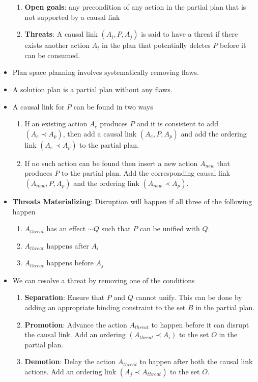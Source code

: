 \documentclass[a4paper]{article}
\begin{document}
\begin{itemize}
    \begin{enumerate}
        \item \textbf{Open goals}: any precondition of any action in the partial plan that is not supported by a causal link
        \item \textbf{Threats}: A causal link $(A_i,P,A_j)$ is said to have a threat if there exists another action $A_t$ in the plan that potentially deletes $P$ before it can be consumed.
    \end{enumerate}
    \item Plan space planning involves systematically removing flaws.
    \item A solution plan is a partial plan without any flaws.
    \item A causal link for $P$ can be found in two ways
    \begin{enumerate}
        \item If an existing action $A_e$ produces $P$ and it is consistent to add $(A_e\prec A_p)$, then add a causal link $(A_e,P,A_p)$ and add the ordering link $(A_e\prec A_p)$ to the partial plan.
        \item If no such action can be found then insert a new action $A_{new}$ that produces $P$ to the partial plan. Add the corresponding causal link $(A_{new},P,A_p)$ and the ordering link $(A_{new}\prec A_p)$.
    \end{enumerate}
    \item \textbf{Threats Materializing}: Disruption will happen if all three of the following happen
    \begin{enumerate}
        \item $A_{threat}$ has an effect $\sim Q$ such that $P$ can be unified with $Q$.
        \item $A_{threat}$ happens after $A_i$
        \item $A_{threat}$ happens before $A_j$
    \end{enumerate}
    \item We can resolve a threat by removing one of the conditions
    \begin{enumerate}
        \item \textbf{Separation}: Ensure that $P$ and $Q$ cannot unify. This can be done by adding an appropriate binding constraint to the set $B$ in the partial plan.
        \item \textbf{Promotion}: Advance the action $A_{threat}$ to happen before it can disrupt the causal link. Add an ordering $(A_{threat}\prec A_i)$ to the set $O$ in the partial plan.
        \item \textbf{Demotion}: Delay the action $A_{threat}$ to happen after both the causal link actions. Add an ordering link $(A_j\prec A_{threat})$ to the set $O$.
    \end{enumerate}
\end{itemize}
\end{document}

